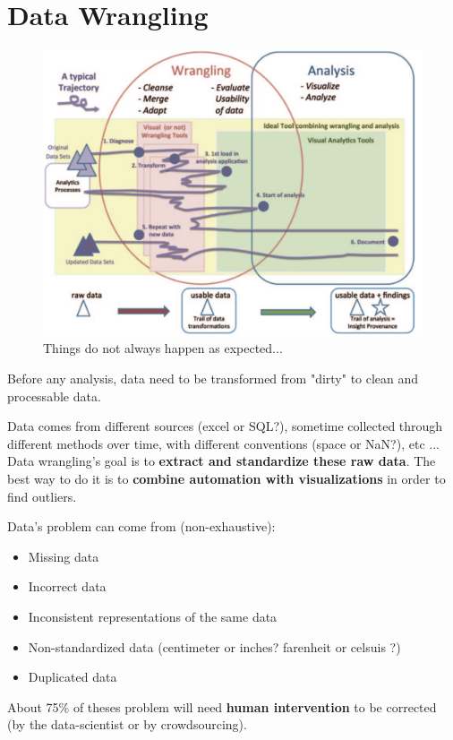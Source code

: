 \documentclass[a4paper,11pt,twoside]{article}
\begin{document}
\section{Data Wrangling}

\begin{figure}%
 \centering
 \includegraphics[width=12cm]{./pic/path_data_wrangling}
 \caption{\label{path_data_wrangling}Things do not always happen as expected...}
\end{figure}

Before any analysis, data need to be transformed from "dirty" to clean and processable data. 

Data comes from different sources (excel or SQL?), sometime collected through different methods over time, with different conventions (space or NaN?), etc ... Data wrangling's goal is to \textbf{extract and standardize these raw data}. The best way to do it is to \textbf{combine automation with visualizations} in order to find outliers. 

Data's problem can come from (non-exhaustive): 
\begin{itemize}
  \item Missing data
  \item Incorrect data
  \item Inconsistent representations of the same data
  \item Non-standardized data (centimeter or inches? farenheit or celsuis ?)
  \item Duplicated data
\end{itemize}

About 75\% of theses problem will need \textbf{human intervention} to be corrected (by the data-scientist or by crowdsourcing).
\end{document}
